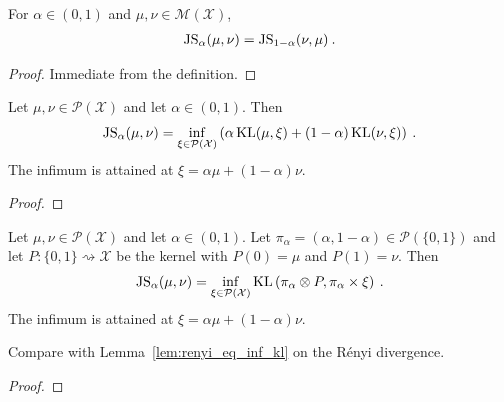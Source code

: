 \begin{lemma}
  \label{lem:jensenShannon_symm}
  For $\alpha \in (0,1)$ and $\mu, \nu \in \mathcal M(\mathcal X)$,
  \begin{align*}
  \operatorname{JS}_\alpha(\mu, \nu) = \operatorname{JS}_{1 - \alpha}(\nu, \mu) \: .
  \end{align*}
\end{lemma}

\begin{proof}%
\uses{}
Immediate from the definition.
\end{proof}


\begin{lemma}
  \label{lem:jensenShannon_eq_inf_add_kl}
  Let $\mu, \nu \in \mathcal P(\mathcal X)$ and let $\alpha \in (0, 1)$. Then
  \begin{align*}
  \operatorname{JS}_\alpha(\mu, \nu) = \inf_{\xi \in \mathcal P(\mathcal X)}\left( \alpha \operatorname{KL}(\mu, \xi) + (1 - \alpha)\operatorname{KL}(\nu, \xi) \right) \: .
  \end{align*}
  The infimum is attained at $\xi = \alpha \mu + (1 - \alpha) \nu$.
\end{lemma}

\begin{proof}%
\uses{}

\end{proof}


\begin{lemma}
  \label{lem:jensenShannon_eq_inf_kl}
  Let $\mu, \nu \in \mathcal P(\mathcal X)$ and let $\alpha \in (0, 1)$. Let $\pi_\alpha = (\alpha, 1 - \alpha) \in \mathcal P(\{0,1\})$ and let $P : \{0,1\} \rightsquigarrow \mathcal X$ be the kernel with $P(0) = \mu$ and $P(1) = \nu$. Then
  \begin{align*}
  \operatorname{JS}_\alpha(\mu, \nu) = \inf_{\xi \in \mathcal P(\mathcal X)} \operatorname{KL}\left( \pi_\alpha \otimes P, \pi_\alpha \times \xi \right) \: .
  \end{align*}
  The infimum is attained at $\xi = \alpha \mu + (1 - \alpha) \nu$.
\end{lemma}

Compare with Lemma~\ref{lem:renyi_eq_inf_kl} on the Rényi divergence.

\begin{proof}%
{}

\end{proof}


